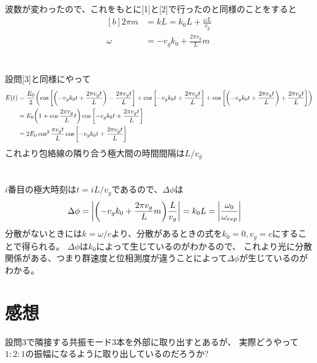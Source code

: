 \documentclass[../ap_2010.tex]{subfiles}
\begin{document}
\section{}
波数が変わったので、これをもとに[1]と[2]で行ったのと同様のことをすると
\begin{equation}\begin{aligned}[b]
    2\pi m &= kL = k_0L+\frac{\omega L}{v_g}\\
    \omega &= -v_gk_0+\frac{2\pi v_g}{L}m
\end{aligned}\end{equation}

\section{}
設問[3]と同様にやって
\begin{equation}\begin{aligned}[b]
    E(t) &= \frac{E_0}{2}\qty(\cos\qty[\qty(-v_gk_0t+\frac{2\pi v_gt}{L})-\frac{2\pi v_gt}{L}]
    +\cos\qty[-v_gk_0t+\frac{2\pi v_gt}{L}]
    +\cos\qty[\qty(-v_gk_0t+\frac{2\pi v_gt}{L})+\frac{2\pi v_gt}{L}])\\
    &= E_0\qty(1+\cos\frac{2\pi v_g}{L}t)\cos\qty[-v_gk_0t+\frac{2\pi v_gt}{L}]\\
    &= 2E_0\cos^2\frac{\pi v_gt}{L}\cos\qty[-v_gk_0t+\frac{2\pi v_gt}{L}]
\end{aligned}\end{equation}
これより包絡線の隣り合う極大間の時間間隔は\(L/v_g\)

\section{}
\(i\)番目の極大時刻は\(t=iL/v_g\)であるので、\(\Delta\phi\)は
\begin{equation}\begin{aligned}[b]
    \Delta\phi &= \abs{\qty(-v_gk_0+\frac{2\pi v_g}{L}m)\frac{L}{v_g}} = k_0L = \abs{\frac{\omega_0}{\omega_{rep}}}
\end{aligned}\end{equation}
分散がないときには\(k=\omega/c\)より、分散があるときの式を\(k_0=0,v_g=c\)にすることで得られる。
\(\Delta\phi\)は\(k_0\)によって生じているのがわかるので、
これより光に分散関係がある、つまり群速度と位相測度が違うことによって\(\Delta\phi\)が生じているのがわかる。

\section*{感想}
設問3で隣接する共振モード3本を外部に取り出すとあるが、
実際どうやって\(1:2:1\)の振幅になるように取り出しているのだろうか?
\end{document}
